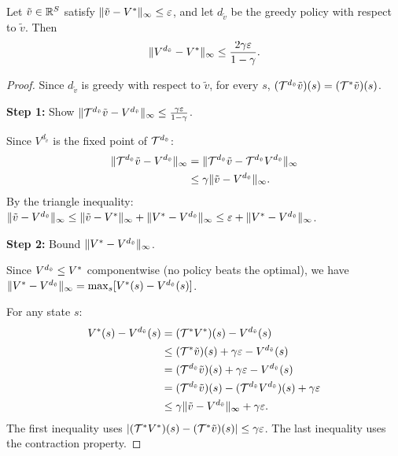 \documentclass[11pt,a4paper]{article}
\begin{document}
\begin{theorem}
\label{thm:approx-policy}
Let $\tilde{v} \in \mathbb{R}^S$ satisfy
$\|\tilde{v} - V^*\|_\infty \leq \varepsilon$, and let
$d_{\tilde{v}}$ be the greedy policy with respect to $\tilde{v}$.
Then
\[
    \|V^{d_{\tilde{v}}} - V^*\|_\infty
    \leq \frac{2\gamma\varepsilon}{1-\gamma}.
\]
\end{theorem}

\begin{proof}
Since $d_{\tilde{v}}$ is greedy with respect to $\tilde{v}$, for
every $s$,
$(\mathcal{T}^{d_{\tilde{v}}} \tilde{v})(s) = (\mathcal{T}^* \tilde{v})(s)$.

\textbf{Step 1:} Show $\|\mathcal{T}^{d_{\tilde{v}}} \tilde{v} -
V^{d_{\tilde{v}}}\|_\infty \leq
\frac{\gamma \varepsilon}{1-\gamma}$.

Since $V^{d_{\tilde{v}}}$ is the fixed point of
$\mathcal{T}^{d_{\tilde{v}}}$:
\begin{align*}
    \|\mathcal{T}^{d_{\tilde{v}}} \tilde{v} - V^{d_{\tilde{v}}}\|_\infty
    &= \|\mathcal{T}^{d_{\tilde{v}}} \tilde{v}
    - \mathcal{T}^{d_{\tilde{v}}} V^{d_{\tilde{v}}}\|_\infty \\
    &\leq \gamma \|\tilde{v} - V^{d_{\tilde{v}}}\|_\infty.
\end{align*}
By the triangle inequality:
$\|\tilde{v} - V^{d_{\tilde{v}}}\|_\infty \leq
\|\tilde{v} - V^*\|_\infty +
\|V^* - V^{d_{\tilde{v}}}\|_\infty \leq
\varepsilon + \|V^* - V^{d_{\tilde{v}}}\|_\infty$.

\textbf{Step 2:} Bound $\|V^* - V^{d_{\tilde{v}}}\|_\infty$.

Since $V^{d_{\tilde{v}}} \leq V^*$ componentwise (no policy beats
the optimal), we have
$\|V^* - V^{d_{\tilde{v}}}\|_\infty
= \max_s [V^*(s) - V^{d_{\tilde{v}}}(s)]$.

For any state $s$:
\begin{align*}
    V^*(s) - V^{d_{\tilde{v}}}(s)
    &= (\mathcal{T}^* V^*)(s) - V^{d_{\tilde{v}}}(s) \\
    &\leq (\mathcal{T}^* \tilde{v})(s) + \gamma\varepsilon
    - V^{d_{\tilde{v}}}(s) \\
    &= (\mathcal{T}^{d_{\tilde{v}}} \tilde{v})(s) + \gamma\varepsilon
    - V^{d_{\tilde{v}}}(s) \\
    &= (\mathcal{T}^{d_{\tilde{v}}} \tilde{v})(s)
    - (\mathcal{T}^{d_{\tilde{v}}} V^{d_{\tilde{v}}})(s)
    + \gamma\varepsilon \\
    &\leq \gamma \|\tilde{v} - V^{d_{\tilde{v}}}\|_\infty
    + \gamma\varepsilon.
\end{align*}
The first inequality uses
$|(\mathcal{T}^* V^*)(s) - (\mathcal{T}^* \tilde{v})(s)| \leq
\gamma\varepsilon$. The last inequality uses the contraction
property.


\end{proof}
\end{document}
